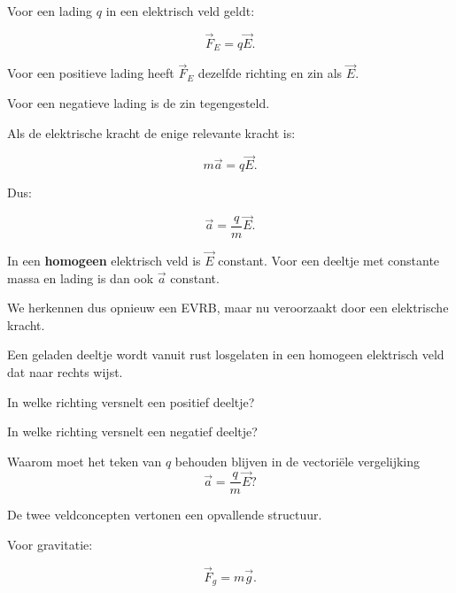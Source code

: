 \documentclass{ximera}
\begin{document}
Voor een lading $q$ in een elektrisch veld geldt:

\[
\boxed{
\vec F_E=q\vec E.
}
\]

Voor een positieve lading heeft $\vec F_E$ dezelfde richting en zin als
$\vec E$.

Voor een negatieve lading is de zin tegengesteld.



Als de elektrische kracht de enige relevante kracht is:

\[
m\vec a=q\vec E.
\]

Dus:

\[
\boxed{
\vec a=\frac qm\vec E.
}
\]

In een \textbf{homogeen} elektrisch veld is $\vec E$ constant. Voor een
deeltje met constante massa en lading is dan ook $\vec a$ constant.

We herkennen dus opnieuw een EVRB, maar nu veroorzaakt door een
elektrische kracht.


\begin{oefening}{\oefB}

Een geladen deeltje wordt vanuit rust losgelaten in een homogeen
elektrisch veld dat naar rechts wijst.

\begin{question}
In welke richting versnelt een positief deeltje?
\end{question}

\begin{question}
In welke richting versnelt een negatief deeltje?
\end{question}

\begin{question}
Waarom moet het teken van $q$ behouden blijven in de vectoriële
vergelijking
\[
\vec a=\frac qm\vec E?
\]
\end{question}

\end{oefening}




De twee veldconcepten vertonen een opvallende structuur.

Voor gravitatie:

\[
\vec F_g=m\vec g.
\]
\end{document}
